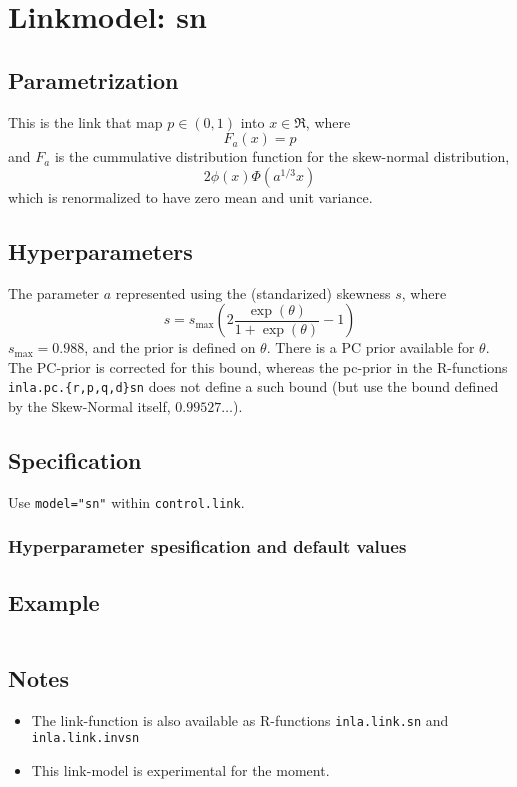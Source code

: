 \documentclass[a4paper,11pt]{article}
\begin{document}
\section*{Linkmodel: sn}

\subsection*{Parametrization}

This is the link that map $p\in (0,1)$ into $x\in\Re$, where
\begin{displaymath}
    F_{a}(x) = p
\end{displaymath}
and $F_{a}$ is the cummulative distribution function for the
skew-normal distribution,
\begin{displaymath}
    2\phi(x)\Phi(a^{1/3}x)
\end{displaymath}
which is renormalized to have zero mean and unit variance.

\subsection*{Hyperparameters}

The parameter $a$ represented using the (standarized) skewness $s$,
where
\begin{displaymath}
    s = s_{\text{max}} \left(2\frac{\exp(\theta)}{1+ \exp(\theta)} -1\right)
\end{displaymath}
$s_{\text{max}} = 0.988$, and the prior is defined on $\theta$. There
is a PC prior available for $\theta$.
The PC-prior is corrected for
this bound, whereas the pc-prior in the R-functions
\texttt{inla.pc.\{r,p,q,d\}sn} does not define a such bound (but use
the bound defined by the Skew-Normal itself, $0.99527\ldots$).

\subsection*{Specification}

Use \texttt{model="sn"} within \texttt{control.link}.  

\subsubsection*{Hyperparameter spesification and default values}


\subsection*{Example}

\begin{verbatim}
\end{verbatim}

\subsection*{Notes}

\begin{itemize}
\item The link-function is also available as R-functions
    \texttt{inla.link.sn} and \texttt{inla.link.invsn}
\item This link-model is experimental for the moment.
\end{itemize}
\end{document}

